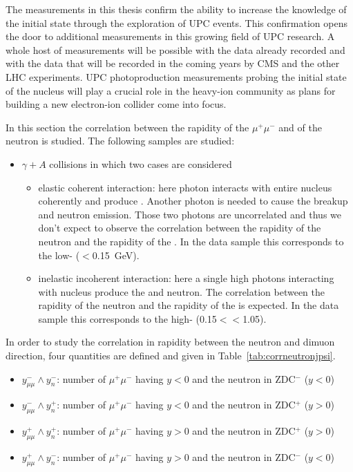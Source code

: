     The measurements in this thesis confirm the ability to increase the 
      knowledge of the initial state through the exploration of UPC events. 
    This confirmation opens the door to additional measurements in this growing 
      field of UPC research.
    A whole host of measurements will be possible with the data already 
      recorded and with the data that will be recorded in the coming years by 
      CMS and the other LHC experiments.
    UPC photoproduction measurements probing the initial state of the nucleus 
      will play a crucial role in the heavy-ion community as plans for building
      a new electron-ion collider come into focus. 

\iffalse
    In this section the correlation between the rapidity of the $\mu^{+}\mu^{-}$ 
      and of the neutron is studied. The following samples are studied: 
    \begin{itemize}
      \item $\gamma + A$ collisions in which two cases are considered
      \begin{itemize}
        \item elastic coherent interaction: here photon interacts with entire
          nucleus coherently and produce \JPsi. 
          Another photon is needed to cause the breakup and neutron emission. 
          Those two photons are uncorrelated and thus we don't expect to 
            observe the correlation between the rapidity of the neutron and the
            rapidity of the \JPsi.
          In the data sample this corresponds to the low-\pt \JPsi 
            (\pt$<$0.15~GeV). 
        \item inelastic incoherent interaction: here a single high \pt photons
          interacting with nucleus produce the \JPsi and neutron. 
          The correlation between the rapidity of the neutron and the rapidity
            of the \JPsi is expected.
          In the data sample this corresponds to the high-\pt \JPsi 
            (0.15$<$\pt$<$1.05). 
      \end{itemize}
    \end{itemize}

    In order to study the correlation in rapidity between the neutron and
      dimuon direction, four quantities are defined and given in 
      Table~\ref{tab:corrneutronjpsi}.  
    \begin{itemize}
      \item $y^{-}_{\mu\mu} \wedge y_{n}^{-}$: number of $\mu^{+}\mu^{-}$ having
         $y<0$ and the neutron in ZDC$^{-}$ ($y<0$)
      \item $y^{-}_{\mu\mu} \wedge y_{n}^{+}$: number of $\mu^{+}\mu^{-}$ having
         $y<0$ and the neutron in ZDC$^{+}$ ($y>0$)
      \item $y^{+}_{\mu\mu} \wedge y_{n}^{+}$: number of $\mu^{+}\mu^{-}$ having
         $y>0$ and the neutron in ZDC$^{+}$ ($y>0$)
      \item $y^{+}_{\mu\mu} \wedge y_{n}^{-}$: number of $\mu^{+}\mu^{-}$ having
         $y>0$ and the neutron in ZDC$^{-}$ ($y<0$)
    \end{itemize}

